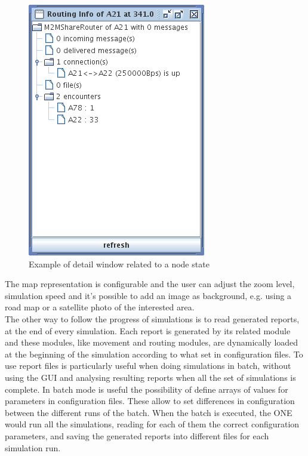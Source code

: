 \begin{figure}[htpb]
  \begin{center}
    \includegraphics[scale=0.6]{5-simulatore/img/Routing-Info.png}
    \caption[Routing Info]{Example of detail window related to a node state}    
    \label{Routing-Info}
  \end{center}
\end{figure}

The map representation is configurable and the user can adjust the zoom level, simulation speed and it's possible to add an image as background, e.g. using a road map or a satellite photo of the interested area.
\\

The other way to follow the progress of simulations is to read generated reports, at the end of every simulation. Each report is generated by its related module and these modules, like movement and routing modules, are dynamically loaded at the beginning of the simulation according to what set in configuration files. To use report files is particularly useful when doing simulations in batch, without using the GUI and analysing resulting reports when all the set of simulations is complete. In batch mode is useful the possibility of define arrays of values for parameters in configuration files. These allow to set differences in configuration between the different runs of the batch. When the batch is executed, the ONE would run all the simulations, reading for each of them the correct configuration parameters, and saving the generated reports into different files for each simulation run.
\\

